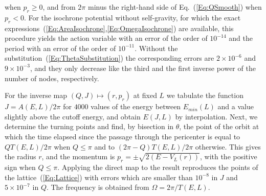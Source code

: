 when $p_r\geq 0$, and from $2\pi$ minus the right-hand side of Eq.~(\ref{Eq:QSmooth}) when $p_r < 0$. For the isochrone potential without self-gravity, for which the exact expressions~(\ref{Eq:AreaIsochrone},\ref{Eq:OmegaIsochrone}) are available, this procedure yields the action variable with an error of the order of $10^{-14}$ and the period with an error of the order of $10^{-11}$. Without the substitution~(\ref{Eq:ThetaSubstitution}) the corresponding errors are $2\times 10^{-6}$ and $9\times 10^{-3}$, and they only decrease like the third and the first inverse power of the number of nodes, respectively.

For the inverse map $(Q,J)\mapsto (r,p_r)$ at fixed $L$ we tabulate the function $J = A(E,L)/2\pi$ for $4000$ values of the energy between $E_{min}(L)$ and a value slightly above the cutoff energy, and obtain $E(J,L)$ by interpolation. Next, we determine the turning points and find, by bisection in $\theta$, the point of the orbit at which the time elapsed since the passage through the pericenter is equal to $QT(E,L)/2\pi$ when $Q\leq \pi$ and to $(2\pi - Q)T(E,L)/2\pi$ otherwise. This gives the radius $r$, and the momentum is $p_r = \pm\sqrt{2(E - V_L(r))}$, with the positive sign when $Q\leq \pi$. Applying the direct map to the result reproduces the points of the lattice~(\ref{Eq:Lattice}) with errors which are smaller than $10^{-8}$ in $J$ and $5\times 10^{-7}$ in $Q$. The frequency is obtained from $\Omega = 2\pi/T(E,L)$.
